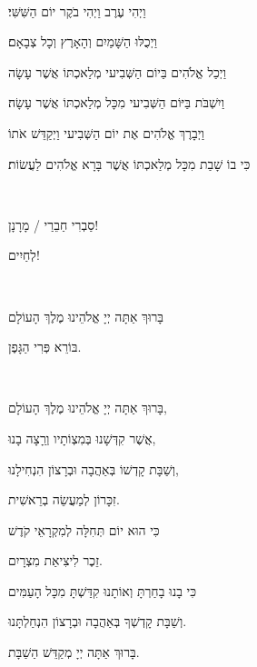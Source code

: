 \documentclass[letterpaper,10pt]{article}
\newenvironment{HgHebrew}{\begin{hebrew}\strut\\\noindent\LARGE}{\end{hebrew}}
\begin{document}
\begin{minipage}[t]{.5\linewidth}
\vspace{-5mm}
\begin{HgHebrew} 
\strut וַיְהִי עֶרֶב וַיְהִי בֹקֶר יוֹם הַשִּׁשִּׁי׃ \\
\strut וַיְכֻלּוּ הַשָּׁמַיִם וְהָאָרֶץ וְכָל צְבָאָם׃ \\
\strut וַיְכַל אֱלֹהִים בַּיוֹם הַשְּׁבִיעי מְלַאכְתּוֹ אֲשֶׁר עָשָׂה \\
\strut וַיִשְׁבֹּת בַּיּוֹם הַשְּׁבִיעי מִכָּל מְלַאכְתּוֹ אֲשֶׁר עָשָׂה׃ \\
\strut וַיְבָרֶךְ אֱלֹהִים אֶת יוֹם הַשְּׁבִיעי וַיְקַדֵּשׁ אֹתוֹ \\
\strut כִּי בוֹ שָׁבַת מִכָּל מְלַאכְתּוֹ אֲשֶׁר בָּרָא אֱלֹהִים לַעֲשׂוֹת׃ \\
\strut \\
\strut סַבְרִי חַבֵרַי / מָרָנָן! \\
\strut לְחַיִים! \\
\strut \\
\strut בָּרוּךְ אַתָּה יְיָ אֱלֹהֵינוּ מֶלֶךְ הָעוֹלָם \\
\strut בּוֹרֵא פְּרִי הַגָּפֶן.  \\
\strut \\
\strut בָּרוּךְ אַתָּה יְיָ אֱלֹהֵינוּ מֶלֶךְ הָעוֹלָם, \\
\strut אֲשֶׁר קִדְּשָׁנוּ בְּמִצְוֹתָיו וְרַָצָה בָנוּ, \\
\strut וְשַׁבָּת קָדְשׁוֹ בְּאַהֲבָה וּבְרָצוֹן הִנְחִילָנוּ, \\
\strut זִכָּרוֹן לְמַעֲשֵׂה בְרֵאשִׁית.  \\
\strut כִּי הוּא יוֹם תְּחִלָּה לְמִקְרָאֵי קֹדֶשׁ \\
\strut זֵכֶר לִיצִיאַת מִצְרָיִם.  \\
\strut כִּי בָנוּ בָחַרְתָּ וְאוֹתָנוּ קִדַּשְׁתָּ מִכָּל הָעַמִּים \\
\strut וְשַׁבָּת קָדְשְׁךָ בְּאַהֲבָה וּבְרָצוֹן הִנְחַלְתָּנוּ.  \\
\strut בָּרוּךְ אַתָּה יְיָ מְקַדֵּשׁ הַשַׁבָּת.  \\
\end{HgHebrew}
\end{minipage}
\end{document}
